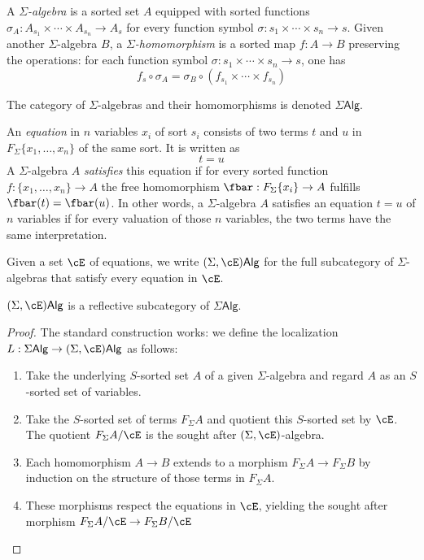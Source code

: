 \documentclass{amsart}
\begin{document}
\begin{defn}
  A \emph{$\Sigma$-algebra} is a sorted set $A$ equipped with sorted functions $\sigma_{A} : A_{s_{1}} \times \cdots \times A_{s_{n}} \to A_{s}$ for every function symbol $\sigma : s_{1} \times \cdots \times s_{n} \to s$.
  Given another $\Sigma$-algebra $B$, a \emph{$\Sigma$-homomorphism} is a sorted map $f : A \to B$ preserving the operations: for each function symbol $\sigma : s_{1} \times \cdots \times s_{n} \to s$, one has
  \[
    f_{s} \circ \sigma_{A} = \sigma_{B} \circ (f_{s_{1}} \times \cdots \times f_{s_{n}})
  \]

  The category of $\Sigma$-algebras and their homomorphisms is denoted $\Sigma\mathsf{Alg}$.
\end{defn}

\begin{defn}
  An \emph{equation} in $n$ variables $x_{i}$ of sort $s_{i}$ consists of two terms $t$ and $u$ in $F_{\Sigma}\{x_{1},\ldots,x_{n}\}$ of the same sort.
  It is written as
  \[
    t = u
  \]
  A $\Sigma$-algebra $A$ \emph{satisfies} this equation if for every sorted function $f : \{x_{1},\ldots,x_{n}\} \to A$ the free homomorphism $\fbar : F_{\Sigma}\{x_{i}\} \to A$ fulfills $\fbar(t) = \fbar(u)$.
  In other words, a $\Sigma$-algebra $A$ satisfies an equation $t = u$ of $n$ variables if for every valuation of those $n$ variables, the two terms have the same interpretation.
\end{defn}

\begin{defn}
  Given a set $\cE$ of equations, we write $(\Sigma,\cE)\mathsf{Alg}$ for the full subcategory of $\Sigma$-algebras that satisfy every equation in $\cE$.
\end{defn}

\begin{thm}
  $(\Sigma,\cE)\mathsf{Alg}$ is a reflective subcategory of $\Sigma\mathsf{Alg}$.
\end{thm}
\begin{proof}
  The standard construction works: we define the localization $L : \Sigma\mathsf{Alg} \to (\Sigma,\cE)\mathsf{Alg}$ as follows:
  \begin{enumerate}
  \item Take the underlying $S$-sorted set $A$ of a given $\Sigma$-algebra and regard $A$ as an $S$-sorted set of variables.
  \item Take the $S$-sorted set of terms $F_{\Sigma}A$ and quotient this $S$-sorted set by $\cE$.
    The quotient $F_{\Sigma}A/\cE$ is the sought after $(\Sigma,\cE)$-algebra.
  \item Each homomorphism $A \to B$ extends to a morphism $F_{\Sigma}A \to F_{\Sigma}B$ by induction on the structure of those terms in $F_{\Sigma}A$.
  \item These morphisms respect the equations in $\cE$, yielding the sought after morphism $F_{\Sigma}A/\cE \to F_{\Sigma}B/\cE$
  \end{enumerate}
\end{proof}



\end{document}
